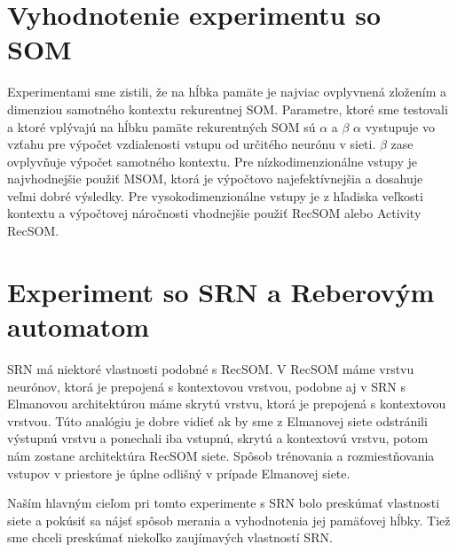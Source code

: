 \section{ Vyhodnotenie experimentu so SOM}
Experimentami sme zistili, že na hĺbka pamäte je najviac ovplyvnená zložením a dimenziou samotného kontextu rekurentnej SOM.
Parametre, ktoré sme testovali a ktoré vplývajú na hĺbku pamäte rekurentných SOM sú $\alpha$ a $\beta$
$\alpha$ vystupuje vo vzťahu pre výpočet vzdialenosti vstupu od určitého neurónu v sieti.
$\beta$ zase ovplyvňuje výpočet samotného kontextu.
Pre nízkodimenzionálne vstupy je najvhodnejšie použiť MSOM, ktorá je výpočtovo najefektívnejšia a dosahuje veľmi dobré 
výsledky.
Pre vysokodimenzionálne vstupy je z hľadiska veľkosti kontextu a výpočtovej náročnosti vhodnejšie použiť RecSOM alebo
Activity RecSOM.


\section{Experiment so SRN a Reberovým automatom}
SRN má niektoré vlastnosti podobné s RecSOM.
V RecSOM máme vrstvu neurónov, ktorá je prepojená s kontextovou vrstvou, podobne 
aj v SRN s Elmanovou architektúrou máme skrytú vrstvu, ktorá je prepojená s kontextovou vrstvou.
Túto analógiu je dobre vidieť ak by sme z Elmanovej siete odstránili výstupnú vrstvu a ponechali iba 
vstupnú, skrytú a kontextovú vrstvu, potom nám zostane architektúra RecSOM siete.
Spôsob trénovania a rozmiestňovania vstupov v priestore je úplne odlišný v prípade Elmanovej siete.

Naším hlavným cieľom pri tomto experimente s SRN bolo preskúmať vlastnosti siete a pokúsiť sa nájsť 
spôsob merania a vyhodnotenia jej pamäťovej hĺbky. 
Tiež sme chceli preskúmať niekoľko zaujímavých vlastností SRN.

